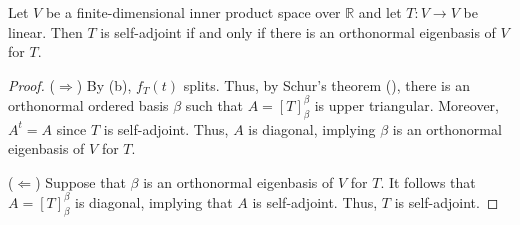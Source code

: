 \begin{theorem}
  Let $V$ be a finite-dimensional inner product space over $\mathbb{R}$ and let
  $T: V \to V$ be linear.
  Then $T$ is self-adjoint if and only if there is an orthonormal eigenbasis of
  $V$ for $T$.
\end{theorem}
\begin{proof}
  ($\Rightarrow$)
  By  (b), $f_T(t)$ splits.
  Thus, by Schur's theorem (), there is an orthonormal ordered
  basis $\beta$ such that $A = [T]_\beta^\beta$ is upper triangular.
  Moreover, $A^t = A$ since $T$ is self-adjoint.
  Thus, $A$ is diagonal, implying $\beta$ is an orthonormal eigenbasis of $V$
  for $T$.

  ($\Leftarrow$)
  Suppose that $\beta$ is an orthonormal eigenbasis of $V$ for $T$.
  It follows that $A = [T]_\beta^\beta$ is diagonal, implying that $A$ is
  self-adjoint.
  Thus, $T$ is self-adjoint.
\end{proof}